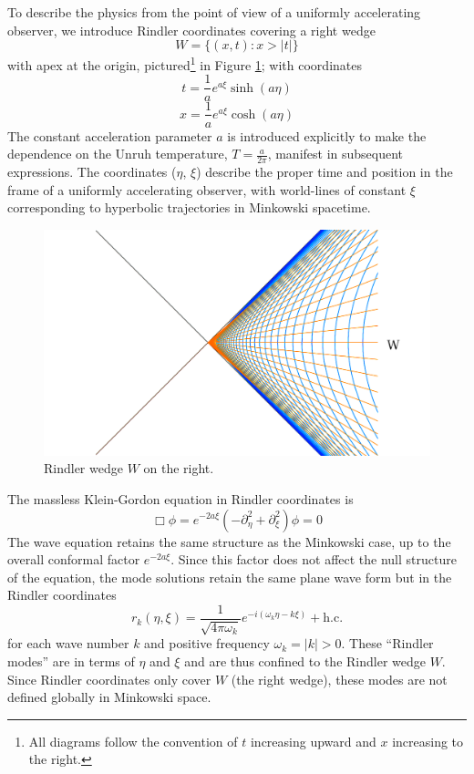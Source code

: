 \documentclass[12pt,a4paper]{article}
\begin{document}
To describe the physics from the point of view of a uniformly accelerating observer, we introduce Rindler coordinates \cite{frodden2018unruh,rindler1966kruskal} covering a right wedge 
\begin{equation}
  W = \{(x,t) : x>|t|\}
\end{equation}
with apex at the origin, pictured\footnote{All diagrams follow the convention of $t$ increasing upward and $x$ increasing to the right.} in Figure \ref{rindlerw}; with coordinates
\begin{equation}
  t = \frac{1}{a}e^{a\xi}\sinh{(a\eta)}
\label{sinh}
\end{equation}
\begin{equation}
x = \frac{1}{a}e^{a\xi}\cosh{(a\eta)}
\end{equation}
The constant acceleration parameter $a$ is introduced explicitly to make the dependence on the Unruh temperature, $T = \frac{a}{2\pi}$, manifest in subsequent expressions. The coordinates ($\eta$, $\xi$) describe the proper time and position in the frame of a uniformly accelerating observer, with world-lines of constant $\xi$ corresponding to hyperbolic trajectories in Minkowski spacetime.

\begin{figure}[h]
\centering
\includegraphics[scale=0.2]{rindler_w.png}
\caption{Rindler wedge $W$ on the right.}
\label{rindlerw}
\end{figure}

The massless Klein-Gordon equation in Rindler coordinates is
\begin{equation}
  \Box \phi = e^{-2a \xi}(-\partial_\eta^2 + \partial_\xi^2) \phi = 0
\end{equation}
The wave equation retains the same structure as the Minkowski case, up to the overall conformal factor $e^{-2a\xi}$. Since this factor does not affect the null structure of the equation, the mode solutions retain the same plane wave form but in the Rindler coordinates
\begin{equation}
 r_k(\eta,\xi) = \frac{1}{\sqrt{4 \pi \omega_k}} e^{-i(\omega_k \eta -k \xi)} + \text{h.c.}
\end{equation}
for each wave number $k$ and positive frequency $\omega_k = |k| > 0$.  These ``Rindler modes'' are in terms of $\eta$ and $\xi$ and are thus confined to the Rindler wedge $W$.  Since Rindler coordinates only cover $W$ (the right wedge), these modes are not defined globally in Minkowski space.
\end{document}
